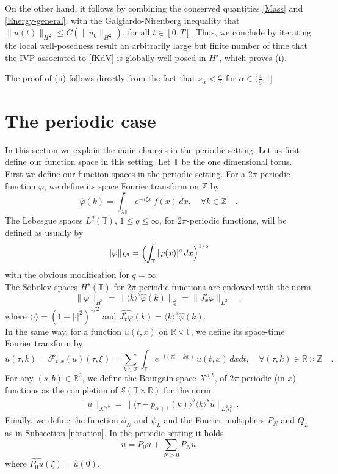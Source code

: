 \documentclass{amsart}
\theoremstyle{definition}
\theoremstyle{remark}
\def\R{{\mathbb R}}
\newcommand{\T}{\mathbb{T}}
\newcommand{\Z}{\mathbb{Z}}
\numberwithin{equation}{section}
\begin{document}
On the other hand, it follows by combining the conserved quantities \eqref{Mass} and \eqref{Energy-general}, with the Galgiardo-Nirenberg inequality that  $\|u(t)\|_{H^{\frac\alpha2}} \le C(\|u_0\|_{H^{\frac\alpha2}})$, for all $t \in [0,T]$. Thus, we conclude by iterating the local well-posedness result an arbitrarily large but finite number of time that the IVP associated to \eqref{fKdV} is globally well-posed in $H^s$, which proves (i). 

The proof of (ii) follows directly from the fact that $s_{\alpha}<\frac{\alpha}2$ for $\alpha \in (\frac45,1]$

\section{The periodic case} \label{Sec:7}
In this section we explain the main changes in the periodic setting. Let us first define our function space in this setting. Let $ \T $ be the one dimensional torus. 
First we define our function spaces in the periodic setting. 
For  a $ 2\pi $-periodic function $ \varphi$, we define its space Fourier transform on
  $ \Z$ by
$$
\hat{\varphi}(k)=\int_{\lambda \T} e^{-i \xi x} \, f(x)
\, dx , \quad \forall k \in \Z \quad .
$$
The Lebesgue spaces $ L^q(\T) $, $ 1\le q \le \infty $,  for $ 2\pi$-periodic functions, will be defined as usually by
$$
\|\varphi\|_{L^q}=\Bigl( \int_{\T} |\varphi(x) |^q \, dx\Bigr)^{1/q}
$$
with the obvious modification for $ q=\infty $. \\
The Sobolev spaces $ H^s(\T)$ for $ 2\pi$-periodic functions are endowed with the norm
$$
\|\varphi\|_{H^s}=\|\langle k \rangle^{s}\widehat{\varphi}(k)
\|_{l^2_k} =\|J^s_x \varphi \|_{L^2} \quad ,
$$
where $ \langle \cdot \rangle = (1+|\cdot|^2)^{1/2} $ and $
\widehat{J^s_x \varphi}(k)=\langle k \rangle^{s}
\widehat{\varphi}(k)
$. \\
In the same way, for a function $ u(t,x) $ on $\R\times \T $, we define its space-time Fourier transform by
$$
\hat{u}(\tau,k)={\mathcal F}_{t,x}(u)(\tau,\xi)=\sum_{k\in\Z}  \int_{ \T} e^{-i (\tau
t+ k x)} \, u(t,x) \, dx dt , \quad \forall (\tau,k) \in
\R\times\Z \quad .
$$
For any $ (s,b) \in \R^2 $, we define the  Bourgain space $ X^{s,b} $,  of $ 2\pi$-periodic (in $x$) functions
  as the completion of $ {\mathcal S}(\T\times \R) $ for the norm
\begin{eqnarray*}
\| u \|_{X^{s,b}}  =
 \| \langle \tau-p_{\alpha+1}(k)\rangle^{b}  \langle k \rangle^s
  \hat{u}\|_{L^2_{\tau} l^2_k} \, .
\end{eqnarray*}
Finally, we define the function $ \phi_N $ and $ \psi_L $
 and  the Fourier multipliers $ P_N $ and $ Q_L $ as in Subsection \ref{notation}.  In the periodic setting it holds
 \begin{equation}\label{mm}
u= P_0 u +\sum_{N>0} P_N u
 \end{equation}
 where $ \widehat{P_0 u}(\xi)=\widehat{u}(0) $.
\end{document}

